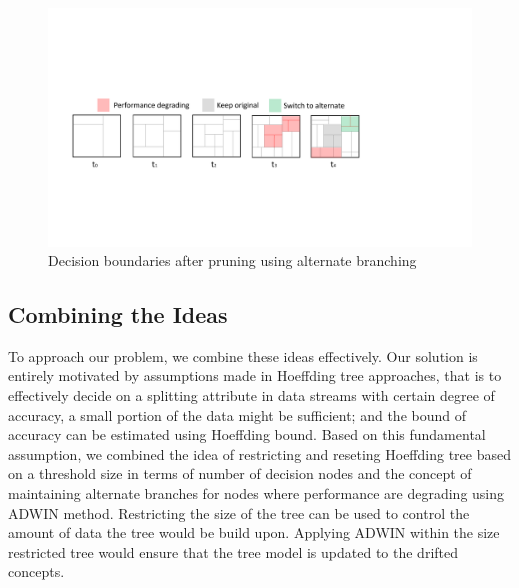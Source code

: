 \begin{figure}[htbp]
    \begin{center}
        \includegraphics[width=14.0cm]{figs/prunedb.pdf}
        \caption{Decision boundaries after pruning using alternate branching}
        \label{fig:algo:prunedb}
    \end{center}
\end{figure}

\subsection{Combining the Ideas}
To approach our problem, we combine these ideas effectively. Our solution is entirely motivated by assumptions made in Hoeffding tree approaches, that is to effectively decide on a splitting attribute in data streams with certain degree of accuracy, a small portion of the data might be sufficient; and the bound of accuracy can be estimated using Hoeffding bound. Based on this fundamental assumption, we combined the idea of restricting and reseting Hoeffding tree based on a threshold size in terms of number of decision nodes and the concept of maintaining alternate branches for nodes where performance are degrading using ADWIN method. Restricting the size of the tree can be used to control the amount of data the tree would be build upon. Applying ADWIN within the size restricted tree would ensure that the tree model is updated to the drifted concepts. 

